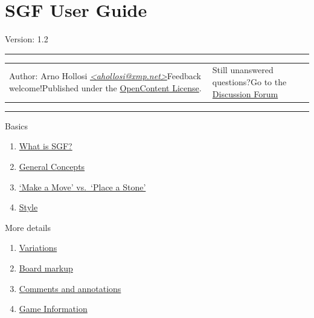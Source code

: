 \section{SGF User Guide}\label{sgf-user-guide}

Version: 1.2

\begin{center}\rule{0.5\linewidth}{0.5pt}\end{center}

{\def\LTcaptype{none} %
\begin{longtable}[]{@{}
  >{\raggedright\arraybackslash}p{}
  >{\raggedright\arraybackslash}p{}@{}}
\toprule\noalign{}
\endhead
\bottomrule\noalign{}
\endlastfoot
Author: Arno Hollosi
\emph{\href{mailto:ahollosi@xmp.net}{\textless ahollosi@xmp.net\textgreater{}}}Feedback
welcome!Published under the
\href{http://www.opencontent.org/opl.shtml}{OpenContent License}. &
Still unanswered questions?Go to the
\href{http://gtl.jeudego.org/phorum/list.php3?num=2}{Discussion
Forum} \\
\end{longtable}
}

\begin{center}\rule{0.5\linewidth}{0.5pt}\end{center}

Basics

\begin{enumerate}
\def\labelenumi{\arabic{enumi}.}
\tightlist
\item
  \href{https://red-bean.com/sgf/user_guide/index.html\#what}{What is
  SGF?}
\item
  \href{https://red-bean.com/sgf/user_guide/index.html\#general}{General
  Concepts}
\item
  \href{https://red-bean.com/sgf/user_guide/index.html\#move_vs_place}{`Make
  a Move' vs.~`Place a Stone'}
\item
  \href{https://red-bean.com/sgf/user_guide/index.html\#style}{Style}
\end{enumerate}

More details

\begin{enumerate}
\def\labelenumi{\arabic{enumi}.}
\setcounter{enumi}{4}
\tightlist
\item
  \href{https://red-bean.com/sgf/user_guide/index.html\#variations}{Variations}
\item
  \href{https://red-bean.com/sgf/user_guide/index.html\#markup}{Board
  markup}
\item
  \href{https://red-bean.com/sgf/user_guide/index.html\#annotations}{Comments
  and annotations}
\item
  \href{https://red-bean.com/sgf/user_guide/index.html\#gameinfo}{Game
  Information}
\end{enumerate}


